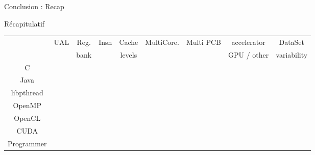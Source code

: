 \begin{Frame}{Conclusion : Recap}

  \begin{block}{Récapitulatif}
\normalsize    \begin{tabular}{|c||c|c|c|c|c|c|c|c|}\hline
      & UAL & Reg.& Insn & Cache & MultiCore. & Multi PCB & accelerator    & DataSet   \\
      &     & bank&      & levels&            &           & GPU /  other   &  variability\\ \hline \hline
    C &     &     &      &       &            &           &                &   \\ \hline
 Java &     &     &      &       &            &           &                &   \\ \hline
libpthread& &     &      &       &            &           &                &  \\ \hline
OpenMP&     &     &      &       &            &           &                &  \\ \hline
OpenCL&     &     &      &       &            &           &                &   \\ \hline
CUDA  &     &     &      &       &            &           &                &   \\  \hline
Programmer& &     &      &       &            &           &                &   \\\hline  \hline
    \end{tabular}
  \end{block}
\end{Frame}
